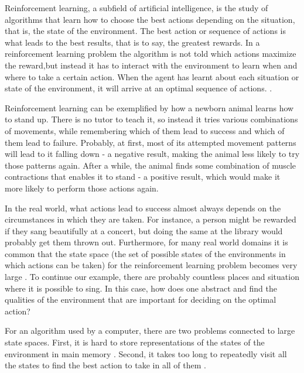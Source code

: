 Reinforcement learning, a subfield of artificial intelligence, is the study of algorithms that learn how to choose the best actions depending on the situation, that is, the state of the environment. The best action or sequence of actions is what leads to the best results, that is to say, the greatest rewards. In a reinforcement learning problem the algorithm is not told which actions maximize the reward,but  instead it has to interact with the environment to learn when and where to take a certain action. When the agent has learnt about each situation or state of the environment, it will arrive at an optimal sequence of actions. \parencite{barto1998reinforcement}.




Reinforcement learning can be exemplified by how a newborn animal learns how to stand up. There is no tutor to teach it, so instead it tries various combinations of movements, while remembering which of them lead to success and which of them lead to failure. Probably, at first, most of its attempted movement patterns will lead to it falling down - a negative result, making the animal less likely to try those patterns again. After a while, the animal finds some combination of muscle contractions that enables it to stand - a positive result, which would make it more likely to perform those actions again. 

In the real world, what actions lead to success almost always depends on the circumstances in which they are taken. For instance, a person might be rewarded if they sang beautifully at a concert, but doing the same at the library would probably get them thrown out. Furthermore, for many real world domains it is common that the state space (the set of possible states of the environments in which actions can be taken) for the reinforcement learning problem becomes very large \parencite{guestrin2003efficient}. To continue our example, there are probably countless places and situation where it is possible to sing. In this case, how does one abstract and find the qualities of the environment that are important for deciding on the optimal action? 

For an algorithm used by a computer, there are two problems connected to large state spaces. First, it is hard to store representations of the states of the environment in main memory \parencite{szepesvari2010algorithms}. Second, it takes too long to repeatedly visit all the states to find the best action to take in all of them \parencite{dietterich2013pac}.